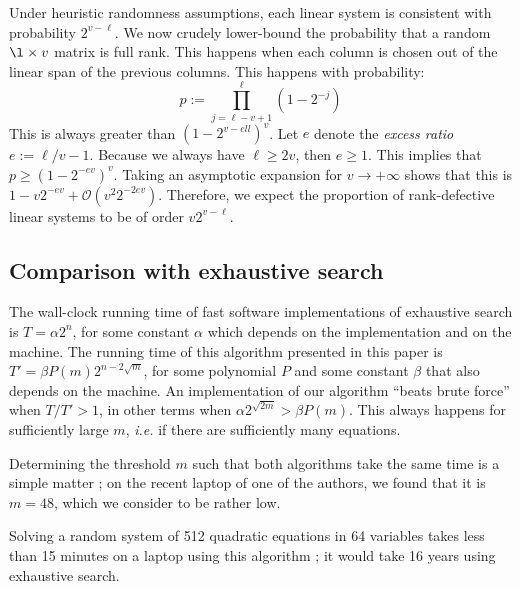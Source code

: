 \documentclass[a4paper,UKenglish,cleveref, autoref]{lipics-v2019}
\newcommand{\bigO}[1]{\ensuremath{\mathcal{O}\left( #1 \right)} }
\begin{document}
Under heuristic randomness assumptions, each linear system is consistent with
probability $2^{v-\ell}$. We now crudely lower-bound the probability that a
random $\l \times v$ matrix is full rank. This happens when each column is
chosen out of the linear span of the previous columns. This happens with
probability:
\[
  p := \prod_{j=\ell-v+1}^\ell \left(1 - 2^{-j} \right)
\]
This is always greater than $\left(1 - 2^{v-ell} \right)^v$. Let $e$ denote the
\emph{excess ratio} $e := \ell/v - 1$. Because we always have $\ell \geq 2v$,
then $e \geq 1$. This implies that $p \geq \left(1 - 2^{-ev} \right)^v$. Taking
an asymptotic expansion for $v \rightarrow +\infty$ shows that this is
$1 - v 2^{-ev} + \bigO{v^2 2^{-2ev}}$. Therefore, we expect the proportion of
rank-defective linear systems to be of order $v 2^{v-\ell}$.


\subsection{Comparison with exhaustive search}

The wall-clock running time of fast software implementations of exhaustive
search is $T = \alpha 2^n$, for some constant $\alpha$ which depends on the
implementation and on the machine. The running time of this algorithm presented
in this paper is $T' = \beta P(m) 2^{n - 2\sqrt{m}}$, for some polynomial $P$
and some constant $\beta$ that also depends on the machine. An implementation of
our algorithm ``beats brute force'' when $T/T' > 1$, in other terms when
$\alpha 2^{\sqrt{2m}} > \beta P(m)$. This always happens for sufficiently large
$m$, \textit{i.e.} if there are sufficiently many equations.

Determining the threshold $m$ such that both algorithms take the same time is a
simple matter ; on the recent laptop of one of the authors, we found that it is
$m=48$, which we consider to be rather low.

Solving a random system of 512 quadratic equations in 64 variables takes less
than 15 minutes on a laptop using this algorithm ; it would take 16 years using exhaustive search.


\end{document}
